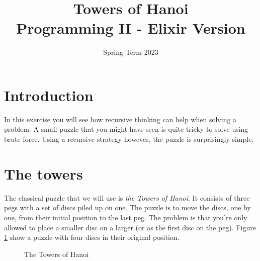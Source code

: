 \documentclass[a4paper,11pt]{article}
\begin{document}
\title{
    \textbf{Towers of Hanoi}\\
    \large{Programming II - Elixir Version}
}
\date{Spring Term 2023}
\maketitle


\thispagestyle{fancy}

\section*{Introduction}

In this exercise you will see how recursive thinking can help when
solving a problem. A small puzzle that you might have seen is quite
tricky to solve using brute force. Using a recursive strategy however,
the puzzle is surprisingly simple.

\section*{The towers}

The classical puzzle that we will use is {\em the Towers of Hanoi}. It
consists of three pegs with a set of discs piled up on one. The
puzzle is to move the discs, one by one, from their initial position
to the last peg. The problem is that you're only allowed to place a
smaller disc on a larger (or as the first disc on the peg).  Figure
\ref{fig:hanoi} show a puzzle with four discs in their original
position.


\begin{figure}[h]
\begin{center}
\end{center}  
\caption{The Towers of Hanoi}
\label{fig:hanoi}
\end{figure}
\end{document}
